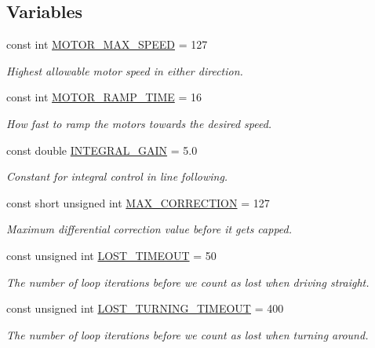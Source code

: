 \subsection*{Variables}
\begin{DoxyCompactItemize}
\item 
const int \hyperlink{namespaceIDP_a4ead0b21ad2c507b542445695182d4cd}{MOTOR\_\-MAX\_\-SPEED} = 127
\begin{DoxyCompactList}\small\item\em Highest allowable motor speed in either direction. \item\end{DoxyCompactList}\item 
const int \hyperlink{namespaceIDP_ab3a00a6cc8a6dba271e38d337daf4703}{MOTOR\_\-RAMP\_\-TIME} = 16
\begin{DoxyCompactList}\small\item\em How fast to ramp the motors towards the desired speed. \item\end{DoxyCompactList}\item 
const double \hyperlink{namespaceIDP_a9107eef10d68ba30176633afd87f1ed4}{INTEGRAL\_\-GAIN} = 5.0
\begin{DoxyCompactList}\small\item\em Constant for integral control in line following. \item\end{DoxyCompactList}\item 
const short unsigned int \hyperlink{namespaceIDP_a246919caaacabcb0399802d542d8330b}{MAX\_\-CORRECTION} = 127
\begin{DoxyCompactList}\small\item\em Maximum differential correction value before it gets capped. \item\end{DoxyCompactList}\item 
const unsigned int \hyperlink{namespaceIDP_ac845248570cca0705d43e2dbb085c3cb}{LOST\_\-TIMEOUT} = 50
\begin{DoxyCompactList}\small\item\em The number of loop iterations before we count as lost when driving straight. \item\end{DoxyCompactList}\item 
const unsigned int \hyperlink{namespaceIDP_a518ca50cb25167a9930b2099282bb938}{LOST\_\-TURNING\_\-TIMEOUT} = 400
\begin{DoxyCompactList}\small\item\em The number of loop iterations before we count as lost when turning around. \item\end{DoxyCompactList}\item 

\end{DoxyCompactItemize}
